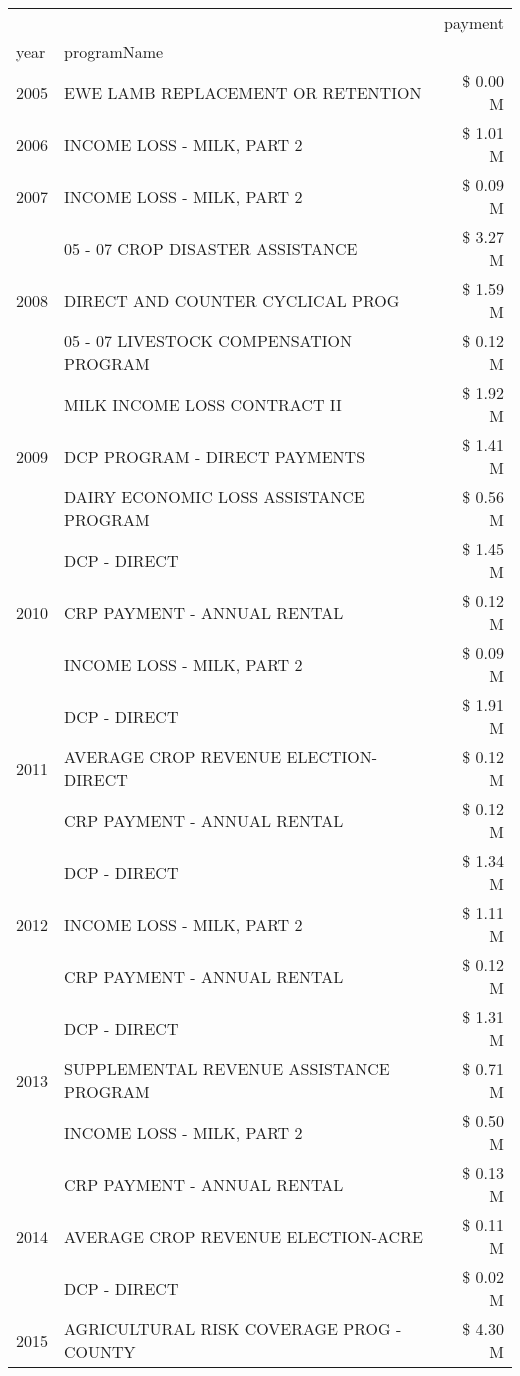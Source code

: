 \begin{tabular}{llr}
\toprule
 &  & payment \\
year & programName &  \\
\midrule
2005 & EWE LAMB REPLACEMENT OR RETENTION & \$ 0.00 M \\
\cline{1-3}
2006 & INCOME LOSS - MILK, PART 2 & \$ 1.01 M \\
\cline{1-3}
2007 & INCOME LOSS - MILK, PART 2 & \$ 0.09 M \\
\cline{1-3}
\multirow[t]{3}{*}{2008} & 05 - 07 CROP DISASTER ASSISTANCE & \$ 3.27 M \\
 & DIRECT AND COUNTER CYCLICAL PROG & \$ 1.59 M \\
 & 05 - 07 LIVESTOCK COMPENSATION PROGRAM & \$ 0.12 M \\
\cline{1-3}
\multirow[t]{3}{*}{2009} & MILK INCOME LOSS CONTRACT II & \$ 1.92 M \\
 & DCP PROGRAM - DIRECT PAYMENTS & \$ 1.41 M \\
 & DAIRY ECONOMIC LOSS ASSISTANCE PROGRAM & \$ 0.56 M \\
\cline{1-3}
\multirow[t]{3}{*}{2010} & DCP - DIRECT & \$ 1.45 M \\
 & CRP PAYMENT - ANNUAL RENTAL & \$ 0.12 M \\
 & INCOME LOSS - MILK, PART 2 & \$ 0.09 M \\
\cline{1-3}
\multirow[t]{3}{*}{2011} & DCP - DIRECT & \$ 1.91 M \\
 & AVERAGE CROP REVENUE ELECTION-DIRECT & \$ 0.12 M \\
 & CRP PAYMENT - ANNUAL RENTAL & \$ 0.12 M \\
\cline{1-3}
\multirow[t]{3}{*}{2012} & DCP - DIRECT & \$ 1.34 M \\
 & INCOME LOSS - MILK, PART 2 & \$ 1.11 M \\
 & CRP PAYMENT - ANNUAL RENTAL & \$ 0.12 M \\
\cline{1-3}
\multirow[t]{3}{*}{2013} & DCP - DIRECT & \$ 1.31 M \\
 & SUPPLEMENTAL REVENUE ASSISTANCE PROGRAM & \$ 0.71 M \\
 & INCOME LOSS - MILK, PART 2 & \$ 0.50 M \\
\cline{1-3}
\multirow[t]{3}{*}{2014} & CRP PAYMENT - ANNUAL RENTAL & \$ 0.13 M \\
 & AVERAGE CROP REVENUE ELECTION-ACRE & \$ 0.11 M \\
 & DCP - DIRECT & \$ 0.02 M \\
\cline{1-3}
\multirow[t]{3}{*}{2015} & AGRICULTURAL RISK COVERAGE PROG - COUNTY & \$ 4.30 M \\

\end{tabular}
